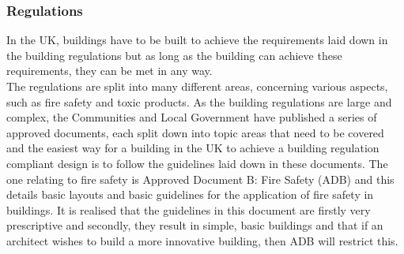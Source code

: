 \documentclass[table,a4paper,oneside]{book}
\begin{document}
\subsubsection{Regulations}
In the UK, buildings have to be built to achieve the requirements laid down in the building regulations but as long as the building can achieve these requirements, they can be met in any way.
\\
The regulations are split into many different areas, concerning various aspects, such as fire safety and toxic products. As the building regulations are large and complex, the Communities and Local Government have published a series of approved documents, each split down into topic areas that need to be covered and the easiest way for a building in the UK to achieve a building regulation compliant design is to follow the guidelines laid down in these documents. The one relating to fire safety is Approved Document B: Fire Safety (ADB) and this details basic layouts and basic guidelines for the application of fire safety in buildings. It is realised that the guidelines in this document are firstly very prescriptive and secondly, they result in simple, basic buildings and that if an architect wishes to build a more innovative building, then ADB will restrict this.
\end{document}
